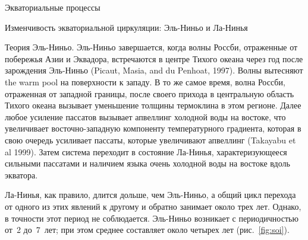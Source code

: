 \begin{chapter}{Экваториальные процессы}
\begin{section}{Изменчивость экваториальной циркуляции: Эль-Ниньо и Ла-Нинья}
\begin{paragraph}{Теория Эль-Ниньо.}
Эль-Ниньо завершается, когда волны Россби, отраженные от побережья Азии
и Эквадора, встречаются в центре Тихого океана через год после 
зарождения Эль-Ниньо (Picaut, Masia, and du Penhoat, 1997). Волны вытесняют
the warm pool на поверхности к западу. В то же самое время, волна 
Россби, отраженная от западной границы, после своего
прихода в центральную область Тихого океана вызывает уменьшение толщины
термоклина в этом регионе. Далее любое 
усиление пассатов вызывает апвеллинг 
холодной воды на востоке, что увеличивает восточно-западную компоненту 
температурного градиента, которая в свою очередь усиливает пассаты,
которые увеличивают апвеллинг (Takayabu et al 1999). Затем система переходит
в состояние Ла-Нинья, характеризующееся сильными пассатами и наличием
языка очень холодной воды на востоке вдоль экватора.
%

Ла-Нинья, как правило, длится дольше, чем Эль-Ниньо, а общий цикл перехода от
одного из этих явлений к другому и обратно занимает около трех лет. Однако,
в точности этот период не соблюдается. Эль-Ниньо возникает с периодичностью
от~2 до~7~лет; при этом среднее составляет около четырех лет 
(рис.~\ref{fig:soi}).
%
\end{paragraph}


\end{section}
\end{chapter}
